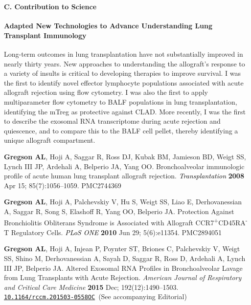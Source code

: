 \documentclass[11pt]{nih-blank}%
\newcommand{\txsp}[1]{\textsuperscript{#1}}
\numberwithin{equation}{subsection}
\numberwithin{figure}{subsection}
\numberwithin{table}{subsection}
\begin{document}
\medskip
\noindent\textbf{C. Contribution to Science}

\paragraph{Adapted New Technologies to Advance Understanding Lung Transplant Immunology}
Long-term outcomes in lung transplantation have not substantially improved in nearly thirty years. 
New approaches to understanding the allograft's response to a variety of insults is critical to developing therapies to improve survival. 
I was the first to identify novel effector lymphocyte populations associated with acute allograft rejection using flow cytometry. 
I was also the first to apply multiparameter flow cytometry to BALF populations in lung transplantation, identifying the mTreg as protective against CLAD. 
More recently, I was the first to describe the exosomal RNA transcriptome during acute rejection and quiescence, and to compare this to the BALF cell pellet, thereby identifying a unique allograft compartment. 

\renewcommand{\refname}{\normalsize{}\label{gregsonbs}}
\begin{thebibliography}{1}

 \bibitem[1]{} \textbf{Gregson AL}, Hoji A, Saggar R, Ross DJ, Kubak BM, Jamieson BD, Weigt SS, Lynch III JP, Ardehali A, Belperio JA, Yang OO. Bronchoalveolar immunologic profile of acute human lung transplant allograft rejection. \textcolor{Black}{\textit{Transplantation}} \textbf{2008} Apr 15; 85(7):1056--1059. PMC2744369

  \bibitem[2]{} \textbf{Gregson AL}, Hoji A, Palchevskiy V, Hu S, Weigt SS, Liao E, Derhovanessian A, Saggar R, Song S, Elashoff R, Yang OO, Belperio JA. Protection Against Bronchiolitis Obliterans Syndrome is Associated with Allograft {\smaller CCR}7\txsp{+}{\smaller CD}45RA\txsp{-} T Regulatory Cells. \textcolor{Black}{\textit{PLoS {\smaller ONE}}} \textbf{2010} Jun 29; 5(6):e11354. PMC2894051

 \bibitem[3]{} \textbf{Gregson AL}, Hoji A, Injean P, Poynter ST, Briones C, Palchevskiy V, Weigt SS, Shino M, Derhovanessian A, Sayah D, Saggar R, Ross D, Ardehali A, Lynch III JP, Belperio JA. Altered Exosomal RNA Profiles in Bronchoalveolar Lavage from Lung Transplants with Acute Rejection. \textit{American Journal of Respiratory and Critical Care Medicine} \textbf{2015} Dec; 192(12):1490--1503. \href{http://www.atsjournals.org/doi/abs/10.1164/rccm.201503-0558OC#.VeDm8JWW25M}{\nolinkurl{10.1164/rccm.201503-0558OC}}~(See accompanying Editorial)

\end{thebibliography}
\end{document}
